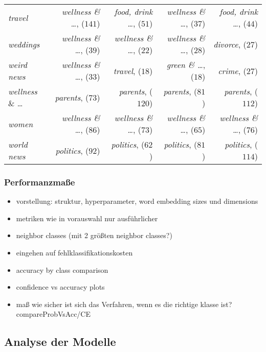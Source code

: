 \documentclass[a4paper,11pt]{article}
\begin{document}
\begin{table}[ht]
\begin{tabular}{|l||rrrr|}
  \textit{travel} & \textit{wellness \& \dots}, ($141$) & \textit{food, drink \dots}, ($51$) & \textit{wellness \& \dots}, ($37$) & \textit{food, \textit{drink} \dots}, ($44$) \\ 
  \textit{weddings} & \textit{wellness \& \dots}, ($39$) & \textit{wellness \& \dots}, ($22$) & \textit{wellness \& \dots}, ($28$) & \textit{divorce}, ($27$) \\ 
  \textit{weird news} & \textit{wellness \& \dots}, ($33$) & \textit{travel}, ($18$) & \textit{green \& \dots}, ($18$) & \textit{crime}, ($27$) \\ 
  \textit{wellness} \& \dots & \textit{parents}, ($73$) & \textit{parents}, ($120$) & \textit{parents}, ($81$) & \textit{parents}, ($112$) \\ 
  \textit{women} & \textit{wellness \& \dots}, ($86$) & \textit{wellness \& \dots}, ($73$) & \textit{wellness \& \dots}, ($65$) & \textit{wellness \& \dots}, ($76$) \\ 
  \textit{world news} & \textit{politics}, ($92$) & \textit{politics}, ($62$) & \textit{politics}, ($81$) & \textit{politics}, ($114$) \\ 
   \hline
\end{tabular}
\label{tab:neighborClasses}
\end{table}



\subsubsection{Performanzmaße}

\begin{itemize}
\item vorstellung: struktur, hyperparameter, word embedding sizes und dimensions
    \item metriken wie in vorauswahl nur ausführlicher
    \item neighbor classes (mit 2 größten neighbor classes?)
    \item eingehen auf fehlklassifikationskosten
    \item accuracy by class comparison
    \item confidence vs accuracy plots
    \item maß wie sicher ist sich das Verfahren, wenn es die richtige klasse ist? compareProbVsAcc/CE
\end{itemize}{}

\subsection{Analyse der Modelle}
\end{document}
